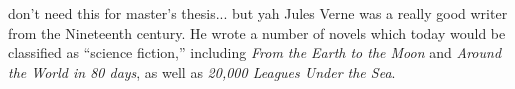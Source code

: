 don't need this for master's thesis...  but yah
Jules Verne was a really good writer from the Nineteenth century.  He wrote a number of
novels which today would be classified as ``science fiction,'' including \textit{From the
Earth to the Moon} and \textit{Around the World in 80 days}, as well as \textit{20,000 
Leagues Under the Sea}.
